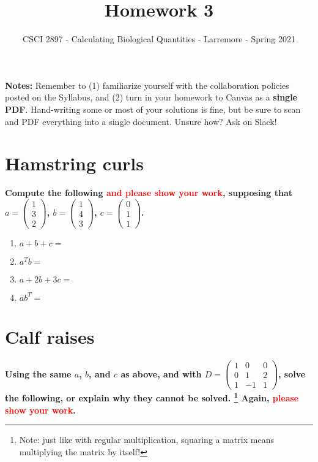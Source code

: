 \documentclass[11pt,onecolumn,superscriptaddress,notitlepage]{article}
\date{}
\newcommand{\so}[1]{\textcolor{red}{#1}}
\begin{document}
\author{CSCI 2897 - Calculating Biological Quantities - Larremore - Spring 2021}
\title{Homework 3}
\maketitle

{\bf Notes:} Remember to (1) familiarize yourself with the collaboration policies posted on the Syllabus, and (2) turn in your homework to Canvas as a {\bf single PDF}. Hand-writing some or most of your solutions is fine, but be sure to scan and PDF everything into a single document. Unsure how? Ask on Slack! 

\section*{Hamstring curls}

{\bf Compute the following \so{and please show your work}, supposing that 
$a=
\begin{pmatrix}
1 \\ 
3 \\
2
\end{pmatrix}$,
$b=
\begin{pmatrix}
1 \\ 
4 \\
3
\end{pmatrix}$,
$c=
\begin{pmatrix}
0 \\ 
1 \\
1
\end{pmatrix}$. 
} 

\begin{enumerate}
	\item $a+b+c = $
	\item $a^{T}b = $
	\item $a+2b+3c = $
	\item $a b^{T} = $
\end{enumerate}

\section*{Calf raises} 

{\bf Using the same $a$, $b$, and $c$ as above, and with 
$D=
\begin{pmatrix}
1 & 0 &0  \\ 
0 & 1 & 2\\
1 & -1& 1
\end{pmatrix}$, solve the following, or explain why they cannot be solved. \footnote{Note: just like with regular multiplication, squaring a matrix means multiplying the matrix by itself!} Again, \so{please show your work}.} 
\end{document}
